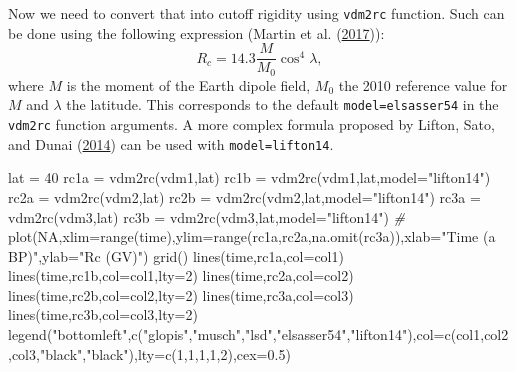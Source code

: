 \documentclass[
]{book}
\newenvironment{Shaded}{\begin{snugshade}}{\end{snugshade}}
\newcommand{\AttributeTok}[1]{\textcolor[rgb]{0.77,0.63,0.00}{#1}}
\newcommand{\CommentTok}[1]{\textcolor[rgb]{0.56,0.35,0.01}{\textit{#1}}}
\newcommand{\ConstantTok}[1]{\textcolor[rgb]{0.00,0.00,0.00}{#1}}
\newcommand{\DecValTok}[1]{\textcolor[rgb]{0.00,0.00,0.81}{#1}}
\newcommand{\FloatTok}[1]{\textcolor[rgb]{0.00,0.00,0.81}{#1}}
\newcommand{\FunctionTok}[1]{\textcolor[rgb]{0.00,0.00,0.00}{#1}}
\newcommand{\NormalTok}[1]{#1}
\newcommand{\OtherTok}[1]{\textcolor[rgb]{0.56,0.35,0.01}{#1}}
\newcommand{\StringTok}[1]{\textcolor[rgb]{0.31,0.60,0.02}{#1}}
\begin{document}
Now we need to convert that into cutoff rigidity using \texttt{vdm2rc} function.
Such can be done using the following expression (Martin et al. (\protect\hyperlink{ref-martin2017crep}{2017})): \[R_c = 14.3 \frac{M}{M_0}\cos^4 \lambda,\] where \(M\) is the moment of the Earth dipole field, \(M_0\) the 2010 reference value for \(M\) and \(\lambda\) the latitude.
This corresponds to the default \texttt{model=elsasser54} in the \texttt{vdm2rc} function arguments.
A more complex formula proposed by Lifton, Sato, and Dunai (\protect\hyperlink{ref-lifton2014scaling}{2014}) can be used with \texttt{model=lifton14}.

\begin{Shaded}
\begin{Highlighting}[]
\NormalTok{lat }\OtherTok{=} \DecValTok{40}
\NormalTok{rc1a }\OtherTok{=} \FunctionTok{vdm2rc}\NormalTok{(vdm1,lat)}
\NormalTok{rc1b }\OtherTok{=} \FunctionTok{vdm2rc}\NormalTok{(vdm1,lat,}\AttributeTok{model=}\StringTok{"lifton14"}\NormalTok{)}
\NormalTok{rc2a }\OtherTok{=} \FunctionTok{vdm2rc}\NormalTok{(vdm2,lat)}
\NormalTok{rc2b }\OtherTok{=} \FunctionTok{vdm2rc}\NormalTok{(vdm2,lat,}\AttributeTok{model=}\StringTok{"lifton14"}\NormalTok{)}
\NormalTok{rc3a }\OtherTok{=} \FunctionTok{vdm2rc}\NormalTok{(vdm3,lat)}
\NormalTok{rc3b }\OtherTok{=} \FunctionTok{vdm2rc}\NormalTok{(vdm3,lat,}\AttributeTok{model=}\StringTok{"lifton14"}\NormalTok{)}
\CommentTok{\#}
\FunctionTok{plot}\NormalTok{(}\ConstantTok{NA}\NormalTok{,}\AttributeTok{xlim=}\FunctionTok{range}\NormalTok{(time),}\AttributeTok{ylim=}\FunctionTok{range}\NormalTok{(rc1a,rc2a,}\FunctionTok{na.omit}\NormalTok{(rc3a)),}\AttributeTok{xlab=}\StringTok{"Time (a BP)"}\NormalTok{,}\AttributeTok{ylab=}\StringTok{"Rc (GV)"}\NormalTok{)}
\FunctionTok{grid}\NormalTok{()}
\FunctionTok{lines}\NormalTok{(time,rc1a,}\AttributeTok{col=}\NormalTok{col1)}
\FunctionTok{lines}\NormalTok{(time,rc1b,}\AttributeTok{col=}\NormalTok{col1,}\AttributeTok{lty=}\DecValTok{2}\NormalTok{)}
\FunctionTok{lines}\NormalTok{(time,rc2a,}\AttributeTok{col=}\NormalTok{col2)}
\FunctionTok{lines}\NormalTok{(time,rc2b,}\AttributeTok{col=}\NormalTok{col2,}\AttributeTok{lty=}\DecValTok{2}\NormalTok{)}
\FunctionTok{lines}\NormalTok{(time,rc3a,}\AttributeTok{col=}\NormalTok{col3)}
\FunctionTok{lines}\NormalTok{(time,rc3b,}\AttributeTok{col=}\NormalTok{col3,}\AttributeTok{lty=}\DecValTok{2}\NormalTok{)}
\FunctionTok{legend}\NormalTok{(}\StringTok{"bottomleft"}\NormalTok{,}\FunctionTok{c}\NormalTok{(}\StringTok{"glopis"}\NormalTok{,}\StringTok{"musch"}\NormalTok{,}\StringTok{"lsd"}\NormalTok{,}\StringTok{"elsasser54"}\NormalTok{,}\StringTok{"lifton14"}\NormalTok{),}\AttributeTok{col=}\FunctionTok{c}\NormalTok{(col1,col2,col3,}\StringTok{"black"}\NormalTok{,}\StringTok{"black"}\NormalTok{),}\AttributeTok{lty=}\FunctionTok{c}\NormalTok{(}\DecValTok{1}\NormalTok{,}\DecValTok{1}\NormalTok{,}\DecValTok{1}\NormalTok{,}\DecValTok{1}\NormalTok{,}\DecValTok{2}\NormalTok{),}\AttributeTok{cex=}\FloatTok{0.5}\NormalTok{)}
\end{Highlighting}
\end{Shaded}
\end{document}
